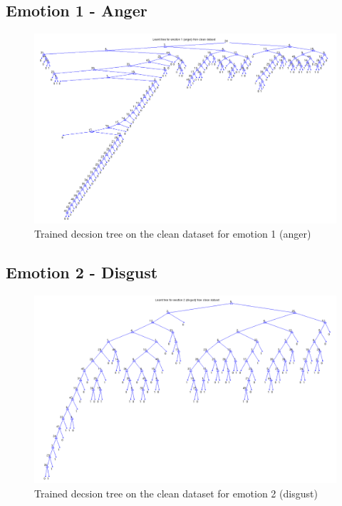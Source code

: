 \documentclass[a4paper]{article}
\begin{document}
\subsection{Emotion 1 - Anger}
\begin{figure}[H]
\center
\includegraphics[width=0.9\columnwidth]{AngerTree} %
\caption{Trained decsion tree on the clean dataset for emotion 1 (anger)}
\end{figure}

\subsection{Emotion 2 - Disgust}
\begin{figure}[H]
\center
\includegraphics[width=0.9\columnwidth]{DisgustTree} %
\caption{Trained decsion tree on the clean dataset for emotion 2 (disgust)}
\end{figure}
\end{document}

